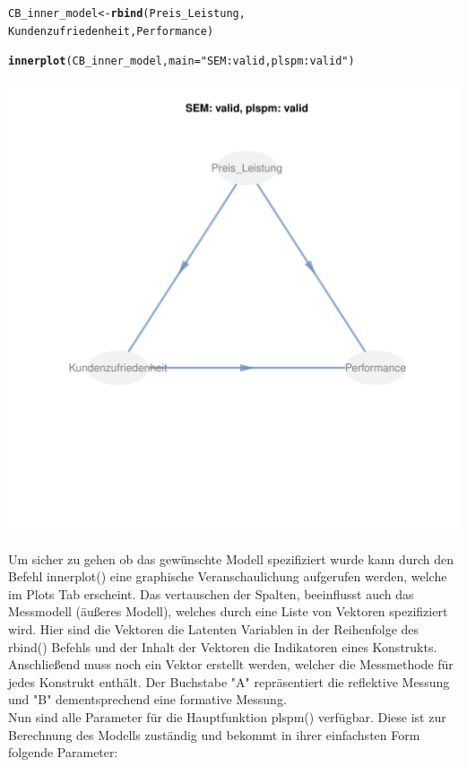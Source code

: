 \documentclass{article}\usepackage[]{graphicx}\usepackage[]{color}
\makeatletter
\def\maxwidth{ %
  \ifdim\Gin@nat@width>\linewidth
    \linewidth
  \else
    \Gin@nat@width
  \fi
}
\newcommand{\hlstr}[1]{\textcolor[rgb]{0.192,0.494,0.8}{#1}}%
\newcommand{\hlstd}[1]{\textcolor[rgb]{0.345,0.345,0.345}{#1}}%
\newcommand{\hlkwb}[1]{\textcolor[rgb]{0.69,0.353,0.396}{#1}}%
\newcommand{\hlkwc}[1]{\textcolor[rgb]{0.333,0.667,0.333}{#1}}%
\newcommand{\hlkwd}[1]{\textcolor[rgb]{0.737,0.353,0.396}{\textbf{#1}}}%
\newenvironment{kframe}{%
 \def\at@end@of@kframe{}%
 \ifinner\ifhmode%
  \def\at@end@of@kframe{\end{minipage}}%
  \begin{minipage}{\columnwidth}%
 \fi\fi%
 \def\FrameCommand##1{\hskip\@totalleftmargin \hskip-\fboxsep
 \colorbox{shadecolor}{##1}\hskip-\fboxsep
     \hskip-\linewidth \hskip-\@totalleftmargin \hskip\columnwidth}%
 \MakeFramed {\advance\hsize-\width
   \@totalleftmargin\z@ \linewidth\hsize
   \@setminipage}}%
 {\par\unskip\endMakeFramed%
 \at@end@of@kframe}
\newenvironment{knitrout}{}{} %
\makeatother
\begin{document}
\begin{knitrout}
\begin{kframe}
\begin{alltt}
\hlstd{CB_inner_model} \hlkwb{<-} \hlkwd{rbind}\hlstd{(Preis_Leistung,}
                        \hlstd{Kundenzufriedenheit, Performance)}

\hlkwd{innerplot}\hlstd{(CB_inner_model,} \hlkwc{main}\hlstd{=}\hlstr{"SEM: valid, plspm: valid"}\hlstd{)}
\end{alltt}
\end{kframe}
\includegraphics[width=\maxwidth]{figure/mis2} 

\end{knitrout}
Um sicher zu gehen ob das gewünschte Modell spezifiziert wurde kann durch den Befehl innerplot() eine graphische Veranschaulichung aufgerufen werden, welche im Plots Tab erscheint. Das vertauschen der Spalten, beeinflusst auch das Messmodell (äußeres Modell), welches durch eine Liste von Vektoren spezifiziert wird. Hier sind die Vektoren die Latenten Variablen in der Reihenfolge des rbind() Befehls und der Inhalt der Vektoren die Indikatoren eines Konstrukts. Anschließend muss noch ein Vektor erstellt werden, welcher die Messmethode für jedes Konstrukt enthält. Der Buchstabe "A" repräsentiert die reflektive Messung und "B" dementsprechend eine formative Messung.\\
Nun sind alle Parameter für die Hauptfunktion plspm() verfügbar. Diese ist zur Berechnung des Modells zuständig und bekommt in ihrer einfachsten Form folgende Parameter:\\
\end{document}
